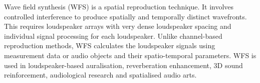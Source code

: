 %
%
%
%
%
%

Wave field synthesis (WFS) is a spatial reproduction technique.
It involves controlled interference to produce spatially and temporally
distinct wavefronts.
%
This requires loudspeaker arrays with very dense loudspeaker spacing and
individual signal processing for each loudspeaker. 
%
Unlike channel-based reproduction methods, WFS calculates the loudspeaker
signals using measurement data or audio objects and their spatio-temporal
parameters.
%
WFS is used in loudspeaker-based auralisation, reverberation enhancement,
3D sound reinforcement, audiological research and spatialised audio arts.

